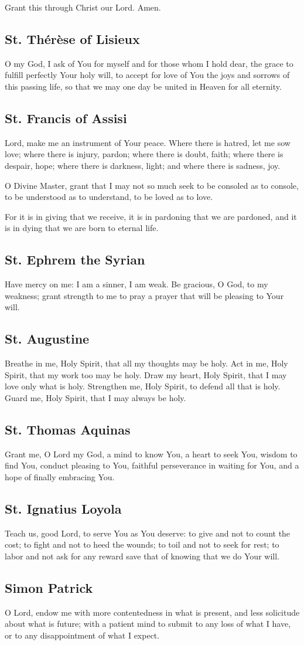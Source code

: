 \documentclass[12pt]{article}
\newcommand{\prayertitle}[1]{\subsection{#1}}
\begin{document}
Grant this through Christ our Lord. Amen.

\prayertitle{St. Th\'{e}r\`{e}se of Lisieux}
O my God, I ask of You for myself and for those whom I hold dear, the grace to fulfill perfectly Your holy will, to accept for love of You the joys and sorrows of this passing life, so that we may one day be united in Heaven for all eternity.

\prayertitle{St. Francis of Assisi}
Lord, make me an instrument of Your peace.
Where there is hatred, let me sow love;
where there is injury, pardon;
where there is doubt, faith;
where there is despair, hope;
where there is darkness, light;
and where there is sadness, joy.

O Divine Master, grant that I may not so much seek to be consoled as to console, to be understood as to understand, to be loved as to love.

For it is in giving that we receive, it is in pardoning that we are pardoned, and it is in dying that we are born to eternal life.

\prayertitle{St. Ephrem the Syrian}
Have mercy on me:
I am a sinner, I am weak.
Be gracious, O God, to my weakness;
grant strength to me to pray a prayer that will be pleasing to Your will.
\newpage
\prayertitle{St. Augustine}
Breathe in me, Holy Spirit, that all my thoughts may be holy.
Act in me, Holy Spirit, that my work too may be holy.
Draw my heart, Holy Spirit, that I may love only what is holy.
Strengthen me, Holy Spirit, to defend all that is holy.
Guard me, Holy Spirit, that I may always be holy.

\prayertitle{St. Thomas Aquinas}
Grant me, O Lord my God,
a mind to know You,
a heart to seek You,
wisdom to find You,
conduct pleasing to You,
faithful perseverance in waiting for You,
and a hope of finally embracing You.

\prayertitle{St. Ignatius Loyola}
Teach us, good Lord, to serve You as You deserve:
to give and not to count the cost;
to fight and not to heed the wounds;
to toil and not to seek for rest;
to labor and not ask for any reward save that of knowing that we do Your will.

\prayertitle{Simon Patrick}
O Lord, endow me with more contentedness in what is present, and less solicitude about what is future;
with a patient mind to submit to any loss of what I have, or to  any disappointment of what I expect.
\end{document}

